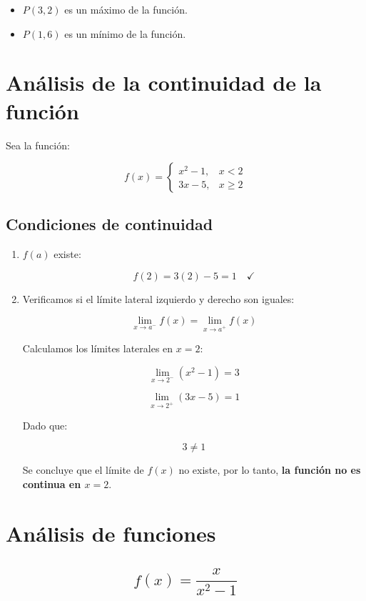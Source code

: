 \begin{itemize}
    \item $P(3, 2)$ es un máximo de la función.
    \item $P(1, 6)$ es un mínimo de la función.
\end{itemize}

\section*{Análisis de la continuidad de la función}

Sea la función:

\[
f(x) =
\begin{cases} 
x^2 - 1, & x < 2 \\
3x - 5, & x \geq 2
\end{cases}
\]

\subsection*{Condiciones de continuidad}

\begin{enumerate}
\item $f(a)$ existe:

\[f(2) = 3(2) - 5 = 1 \quad \checkmark\]

\item Verificamos si el límite lateral izquierdo y derecho son iguales:

\[\lim_{x \to a^-} f(x) = \lim_{x \to a^+} f(x)\]

Calculamos los límites laterales en $x = 2$:

\[\lim_{x \to 2^-} (x^2 -1) = 3\]

\[\lim_{x \to 2^+} (3x -5) = 1\]

Dado que:

\[3 \neq 1\]

Se concluye que el límite de $f(x)$ no existe, por lo tanto, \textbf{la función no es continua en $x=2$}. 
\end{enumerate}

\section*{Análisis de funciones}

\subsection*{\[f(x) = \frac{x}{x^2 - 1}\]}


